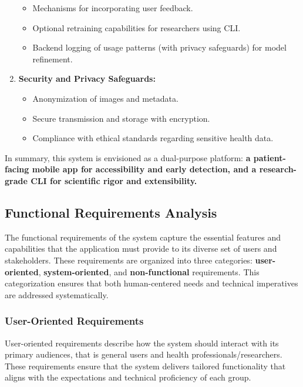 \documentclass[
  12pt,
  oneside]{article}
\providecommand{\tightlist}{%
  \setlength{\itemsep}{0pt}\setlength{\parskip}{0pt}}
\begin{document}
\begin{enumerate}
  \begin{itemize}
  \tightlist
  \item
    Mechanisms for incorporating user feedback.\\
  \item
    Optional retraining capabilities for researchers using CLI.\\
  \item
    Backend logging of usage patterns (with privacy safeguards) for
    model refinement.
  \end{itemize}
\item
  \textbf{Security and Privacy Safeguards:}

  \begin{itemize}
  \tightlist
  \item
    Anonymization of images and metadata.\\
  \item
    Secure transmission and storage with encryption.\\
  \item
    Compliance with ethical standards regarding sensitive health data.
  \end{itemize}
\end{enumerate}

In summary, this system is envisioned as a dual-purpose platform:
\textbf{a patient-facing mobile app for accessibility and early
detection, and a research-grade CLI for scientific rigor and
extensibility.}

\subsection{Functional Requirements
Analysis}\label{functional-requirements-analysis}

The functional requirements of the system capture the essential features
and capabilities that the application must provide to its diverse set of
users and stakeholders. These requirements are organized into three
categories: \textbf{user-oriented}, \textbf{system-oriented}, and
\textbf{non-functional} requirements. This categorization ensures that
both human-centered needs and technical imperatives are addressed
systematically.

\subsubsection{User-Oriented
Requirements}\label{user-oriented-requirements}

User-oriented requirements describe how the system should interact with
its primary audiences, that is general users and health
professionals/researchers. These requirements ensure that the system
delivers tailored functionality that aligns with the expectations and
technical proficiency of each group.
\end{document}
